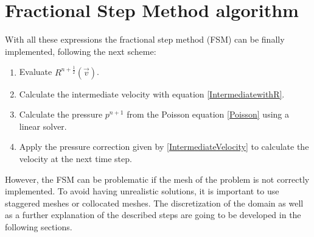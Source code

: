 \section{Fractional Step Method algorithm}
With all these expressions the fractional step method (FSM) can be finally implemented, following the next scheme:
\begin{enumerate}
	\item Evaluate $R^{n+\frac{1}{2}}\left(\vec{v}\right)$.
	\item Calculate the intermediate velocity with equation \ref{IntermediatewithR}.
	\item Calculate the pressure $p^{n+1}$ from the Poisson equation \ref{Poisson} using a linear solver.
	\item Apply the pressure correction given by \ref{IntermediateVelocity} to calculate the velocity at the next time step.
\end{enumerate}
However, the FSM can be problematic if the mesh of the problem is not correctly implemented. To avoid having unrealistic solutions, it is important to use staggered meshes or collocated meshes. The discretization of the domain as well as a further explanation of the described steps are going to be developed in the following sections.


